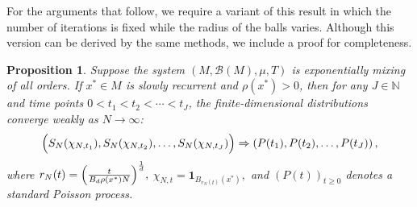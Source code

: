 \documentclass[11pt,twoside,a4paper,reqno]{amsart}
\newtheorem{proposition}[theorem]{Proposition}
\def\one{{\mathbf{1}}}
\begin{document}
For the arguments that follow, we require a variant of this result in which the number of iterations is fixed while the radius of the balls varies. Although this version can be derived by the same methods, we include a proof for completeness.

\begin{proposition}\label{PLTprop}
Suppose the system $(M,\mathcal{B}(M),\mu,T)$ is exponentially mixing of all orders. If $x^* \in M$ is slowly recurrent and $\rho(x^*) > 0$, then for any $J\in \mathbb{N}$ and time points $0<t_1<t_2<\cdots<t_J$, the finite-dimensional distributions converge weakly as $N \to \infty$:
\begin{equation}\label{PCFinDim}
\Bigl(S_N(\chi_{N,t_1}), S_N(\chi_{N,t_2}), \ldots, S_N(\chi_{N,t_J}) \Bigr) \Rightarrow \left(P(t_1), P(t_2), \ldots, P(t_J) \right),
\end{equation}
where
$r_N(t)=\Bigl( \frac{t}{B_d \rho(x^*) N} \Bigr)^{\frac{1}{d}},$ $\chi_{N,t}=\one_{B_{r_N(t)}(x^*)},$
and $(P(t))_{t\geq 0}$ denotes  a standard Poisson process.
\end{proposition}
\end{document}
